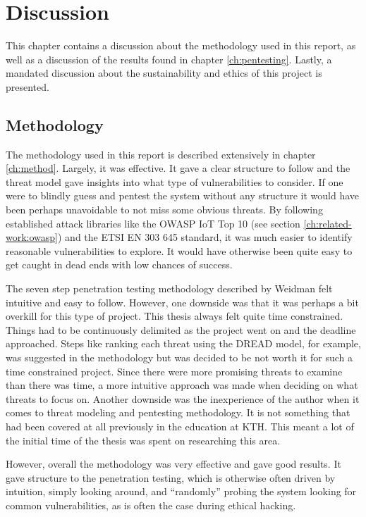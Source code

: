 \chapter{Discussion} \label{ch:discussion}
This chapter contains a discussion about the methodology used in this report, as well as a discussion of the results found in chapter \ref{ch:pentesting}. Lastly, a mandated discussion about the sustainability and ethics of this project is presented.

\section{Methodology}
The methodology used in this report is described extensively in chapter \ref{ch:method}. Largely, it was effective. It gave a clear structure to follow and the threat model gave insights into what type of vulnerabilities to consider. If one were to blindly guess and pentest the system without any structure it would have been perhaps unavoidable to not miss some obvious threats. By following established attack libraries like the OWASP IoT Top 10 \cite{owasp-iot-top10} (see section \ref{ch:related-work:owasp}) and the ETSI EN 303 645 standard, it was much easier to identify reasonable vulnerabilities to explore. It would have otherwise been quite easy to get caught in dead ends with low chances of success.

The seven step penetration testing methodology described by Weidman felt intuitive and easy to follow. However, one downside was that it was perhaps a bit overkill for this type of project. This thesis always felt quite time constrained. Things had to be continuously delimited as the project went on and the deadline approached. Steps like ranking each threat using the DREAD model, for example, was suggested in the methodology but was decided to be not worth it for such a time constrained project. Since there were more promising threats to examine than there was time, a more intuitive approach was made when deciding on what threats to focus on. Another downside was the inexperience of the author when it comes to threat modeling and pentesting methodology. It is not something that had been covered at all previously in the education at KTH. This meant a lot of the initial time of the thesis was spent on researching this area.

However, overall the methodology was very effective and gave good results. It gave structure to the penetration testing, which is otherwise often driven by intuition, simply looking around, and \enquote{randomly} probing the system looking for common vulnerabilities, as is often the case during ethical hacking.

